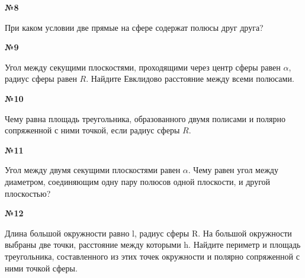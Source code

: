    \begin{center}
        \textbf{№8}
    \end{center}

    При каком условии две прямые на сфере содержат полюсы друг друга?

    \begin{center}
        \textbf{№9}
    \end{center}

    Угол между секущими плоскостями, проходящими через центр сферы равен $\alpha$, радиус сферы равен $R$.
    Найдите Евклидово расстояние между всеми полюсами.

    \begin{center}
        \textbf{№10}
    \end{center}

    Чему равна площадь треугольника, образованного двумя полисами и полярно сопряженной с ними точкой,
    если радиус сферы $R$.

    \begin{center}
        \textbf{№11}
    \end{center}

    Угол между двумя секущими плоскостями равен $\alpha$.
    Чему равен угол между диаметром, соединяющим одну пару полюсов одной плоскости, и другой плоскостью?


    \begin{center}
        \textbf{№12}
    \end{center}

    Длина большой окружности равно l, радиус сферы R.
    На большой окружности выбраны две точки, расстояние между которыми h.
    Найдите периметр и площадь треугольника,
    составленного из этих точек окружности и полярно сопряженной с ними точкой сферы.



